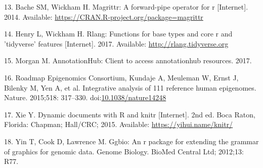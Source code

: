 \documentclass[10pt,letterpaper]{article}
\begin{document}
\hypertarget{ref-R-magrittr}{}
13. Bache SM, Wickham H. Magrittr: A forward-pipe operator for r
{[}Internet{]}. 2014. Available:
\url{https://CRAN.R-project.org/package=magrittr}

\hypertarget{ref-R-rlang}{}
14. Henry L, Wickham H. Rlang: Functions for base types and core r and
'tidyverse' features {[}Internet{]}. 2017. Available:
\url{http://rlang.tidyverse.org}

\hypertarget{ref-R-ahub}{}
15. Morgan M. AnnotationHub: Client to access annotationhub resources.
2017.

\hypertarget{ref-Roadmap_Epigenomics_Consortium2015-pr}{}
16. Roadmap Epigenomics Consortium, Kundaje A, Meuleman W, Ernst J,
Bilenky M, Yen A, et al. Integrative analysis of 111 reference human
epigenomes. Nature. 2015;518: 317--330.
doi:\href{https://doi.org/10.1038/nature14248}{10.1038/nature14248}

\hypertarget{ref-R-knitr}{}
17. Xie Y. Dynamic documents with R and knitr {[}Internet{]}. 2nd ed.
Boca Raton, Florida: Chapman; Hall/CRC; 2015. Available:
\url{https://yihui.name/knitr/}

\hypertarget{ref-R-ggbio}{}
18. Yin T, Cook D, Lawrence M. Ggbio: An r package for extending the
grammar of graphics for genomic data. Genome Biology. BioMed Central
Ltd; 2012;13: R77.

\nolinenumbers
\end{document}
